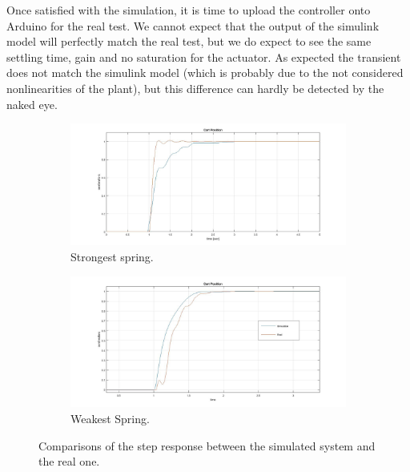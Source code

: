 Once satisfied with the simulation, it is time to upload the controller onto Arduino for the real test. We cannot expect that the output of the simulink model will perfectly match the real test, but we do expect to see the same settling time, gain and no saturation for the actuator. As expected the transient does not match the simulink model (which is probably due to the not considered nonlinearities of the plant), but this difference can hardly be detected by the naked eye. 

\begin{figure}[H]
\begin{subfigure}{0.49\textwidth}
\includegraphics[width=\textwidth]{img/ls_response_kh.jpg}
\caption{Strongest spring.}
\end{subfigure}

\begin{subfigure}{0.49\textwidth}
\includegraphics[width=\textwidth]{img/ls_response_kl.jpg}
\caption{Weakest Spring.}
\end{subfigure}

\caption{Comparisons of the step response between the simulated system and the real one.}
\end{figure}
